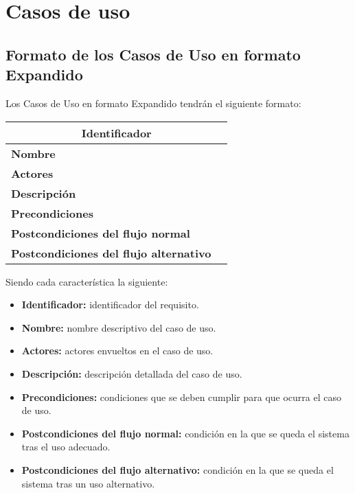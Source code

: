 \section{Casos de uso}
\subsection{Formato de los Casos de Uso en formato Expandido}
\par Los Casos de Uso en formato Expandido tendrán el siguiente formato:

\begin{table}[h]
\begin{center}
\begin{tabular}{p{} p{11cm}}
\multicolumn{2}{c}{\textbf{Identificador} } \\ \hline \hline
\textbf{Nombre} &  \\ \hline
\textbf{Actores} &  \\ \hline
\textbf{Descripción} &  \\ \hline
\textbf{Precondiciones} &  \\ \hline
\textbf{Postcondiciones del flujo normal} &  \\ \hline
\textbf{Postcondiciones del flujo alternativo} &  \\ \hline
\end{tabular}
\end{center}
\end{table}

\par Siendo cada característica la siguiente:
\begin{itemize}
	\item \textbf{Identificador:} identificador del requisito.
	\item \textbf{Nombre:} nombre descriptivo del caso de uso.
	\item \textbf{Actores:} actores envueltos en el caso de uso.
	\item \textbf{Descripción:} descripción detallada del caso de uso.
	\item \textbf{Precondiciones:} condiciones que se deben cumplir para que ocurra el caso de uso.
	\item \textbf{Postcondiciones del flujo normal:} condición en la que se queda el sistema tras el uso adecuado.
	\item \textbf{Postcondiciones del flujo alternativo:} condición en la que se queda el sistema tras un uso alternativo.
\end{itemize}


